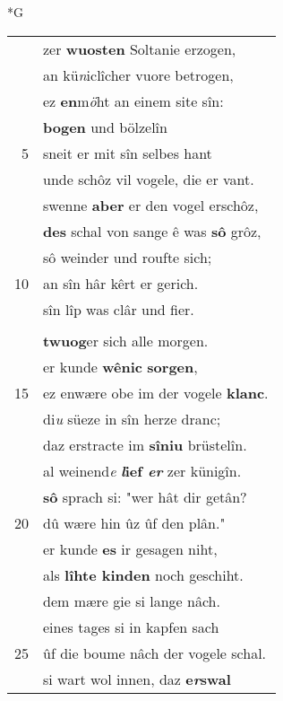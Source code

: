 \documentclass[8pt,a4paper,notitlepage]{article}
\begin{document}
\newpage
\begin{table}[ht]
\begin{minipage}[t]{0.5\linewidth}
\small
\begin{center}*G
\end{center}
\begin{tabular}{rl}
 & zer \textbf{wuosten} Soltanie erzogen,\\ 
 & an kü\textit{n}iclîcher vuore betrogen,\\ 
 & ez \textbf{en}m\textit{ö}ht an einem site sîn:\\ 
 & \textbf{bogen} und bölzelîn\\ 
5 & sneit er mit sîn selbes hant\\ 
 & unde schôz vil vogele, die er vant.\\ 
 & swenne \textbf{aber} er den vogel erschôz,\\ 
 & \textbf{des} schal von sange ê was \textbf{sô} grôz,\\ 
 & sô weinder und roufte sich;\\ 
10 & an sîn hâr kêrt er gerich.\\ 
 & sîn lîp was clâr und fier.\\ 
 & \textbf{\begin{large}Û\end{large}f} dem plân \textbf{\textit{an} einem} rivier\\ 
 & \textbf{twuog}er sich alle morgen.\\ 
 & er kunde \textbf{wênic} \textbf{sorgen},\\ 
15 & ez enwære obe im der vogele \textbf{klanc}.\\ 
 & di\textit{u} süeze in sîn herze dranc;\\ 
 & daz erstracte im \textbf{sîniu} brüstelîn.\\ 
 & al weinend\textit{e} \textbf{\textit{l}ief \textit{er}} zer künigîn.\\ 
 & \textbf{sô} sprach si: "wer hât dir getân?\\ 
20 & dû wære hin ûz ûf den plân."\\ 
 & er kunde \textbf{es} ir gesagen niht,\\ 
 & als \textbf{lîhte kinden} noch geschiht.\\ 
 & dem mære gie si lange nâch.\\ 
 & eines tages si in kapfen sach\\ 
25 & ûf die boume nâch der vogele schal.\\ 
 & si wart wol innen, daz \textbf{e\textit{r}swal}\\ 

\end{tabular}
\end{minipage}
\end{table}
\end{document}
